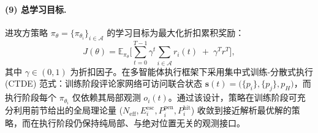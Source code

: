 \paragraph{(9) 总学习目标.}
进攻方策略 $\pi_{\theta}=\{\pi_{\theta_i}\}_{i\in\mathcal{A}}$ 的学习目标为最大化折扣累积奖励：
\begin{equation}
J(\theta)=\mathbb{E}_{\pi_\theta}\Biggl[\sum_{t=0}^{T-1}\gamma^{t}\sum_{i\in\mathcal{A}} r_i(t)\;+\;\gamma^{T} r^{T}\Biggr],
\label{eq:rl-objective}
\end{equation}
其中 $\gamma\in(0,1)$ 为折扣因子。在多智能体执行框架下采用集中式训练-分散式执行 (CTDE) 范式：训练阶段评论家网络可访问联合状态 $\bm{s}(t)=\bigl(\{p_i\},\{p_j\},p_H\bigr)$，而执行阶段每个 $\pi_{\theta_i}$ 仅依赖其局部观测 $o_i(t)$。通过该设计，策略在训练阶段可充分利用前节给出的全局理论量 ($N_{\mathrm{eff}},E_i^{\mathrm{esc}},P_i^{\mathrm{pen}},P_i^{\mathrm{hit}}$) 收敛到接近解析最优解的策略，而在执行阶段仍保持纯局部、与绝对位置无关的观测接口。

